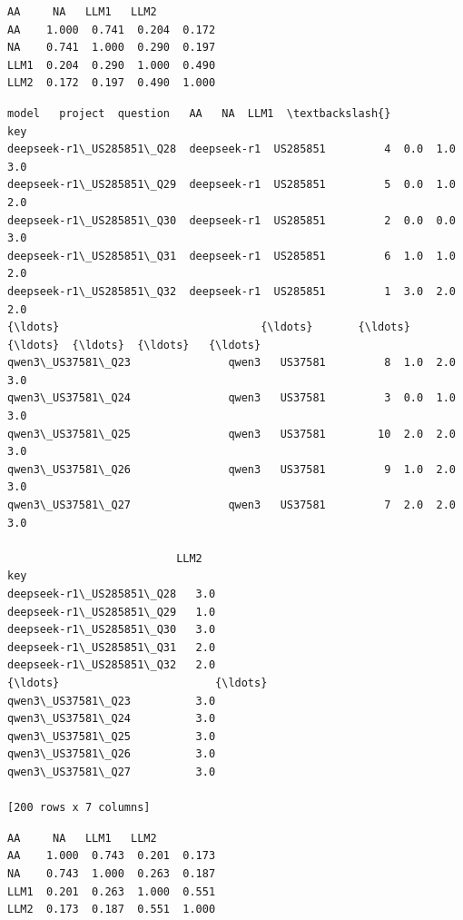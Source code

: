 \documentclass[11pt]{article}
\makeatletter
\newcommand{\boxspacing}{\kern\kvtcb@left@rule\kern\kvtcb@boxsep}
\newcommand{\prompt}[4]{
        {\ttfamily\llap{{\color{#2}[#3]:\hspace{3pt}#4}}\vspace{-\baselineskip}}
    }
\makeatother
\begin{document}
            \begin{tcolorbox}[breakable, size=fbox, boxrule=.5pt, pad at break*=1mm, opacityfill=0]
\prompt{Out}{outcolor}{55}{\boxspacing}
\begin{Verbatim}[commandchars=\\\{\}]
         AA     NA   LLM1   LLM2
AA    1.000  0.741  0.204  0.172
NA    0.741  1.000  0.290  0.197
LLM1  0.204  0.290  1.000  0.490
LLM2  0.172  0.197  0.490  1.000
\end{Verbatim}
\end{tcolorbox}
        
            \begin{tcolorbox}[breakable, size=fbox, boxrule=.5pt, pad at break*=1mm, opacityfill=0]
\prompt{Out}{outcolor}{56}{\boxspacing}
\begin{Verbatim}[commandchars=\\\{\}]
                                model   project  question   AA   NA  LLM1  \textbackslash{}
key
deepseek-r1\_US285851\_Q28  deepseek-r1  US285851         4  0.0  1.0   3.0
deepseek-r1\_US285851\_Q29  deepseek-r1  US285851         5  0.0  1.0   2.0
deepseek-r1\_US285851\_Q30  deepseek-r1  US285851         2  0.0  0.0   3.0
deepseek-r1\_US285851\_Q31  deepseek-r1  US285851         6  1.0  1.0   2.0
deepseek-r1\_US285851\_Q32  deepseek-r1  US285851         1  3.0  2.0   2.0
{\ldots}                               {\ldots}       {\ldots}       {\ldots}  {\ldots}  {\ldots}   {\ldots}
qwen3\_US37581\_Q23               qwen3   US37581         8  1.0  2.0   3.0
qwen3\_US37581\_Q24               qwen3   US37581         3  0.0  1.0   3.0
qwen3\_US37581\_Q25               qwen3   US37581        10  2.0  2.0   3.0
qwen3\_US37581\_Q26               qwen3   US37581         9  1.0  2.0   3.0
qwen3\_US37581\_Q27               qwen3   US37581         7  2.0  2.0   3.0

                          LLM2
key
deepseek-r1\_US285851\_Q28   3.0
deepseek-r1\_US285851\_Q29   1.0
deepseek-r1\_US285851\_Q30   3.0
deepseek-r1\_US285851\_Q31   2.0
deepseek-r1\_US285851\_Q32   2.0
{\ldots}                        {\ldots}
qwen3\_US37581\_Q23          3.0
qwen3\_US37581\_Q24          3.0
qwen3\_US37581\_Q25          3.0
qwen3\_US37581\_Q26          3.0
qwen3\_US37581\_Q27          3.0

[200 rows x 7 columns]
\end{Verbatim}
\end{tcolorbox}
        
            \begin{tcolorbox}[breakable, size=fbox, boxrule=.5pt, pad at break*=1mm, opacityfill=0]
\prompt{Out}{outcolor}{57}{\boxspacing}
\begin{Verbatim}[commandchars=\\\{\}]
         AA     NA   LLM1   LLM2
AA    1.000  0.743  0.201  0.173
NA    0.743  1.000  0.263  0.187
LLM1  0.201  0.263  1.000  0.551
LLM2  0.173  0.187  0.551  1.000
\end{Verbatim}
\end{tcolorbox}
        
\end{document}

